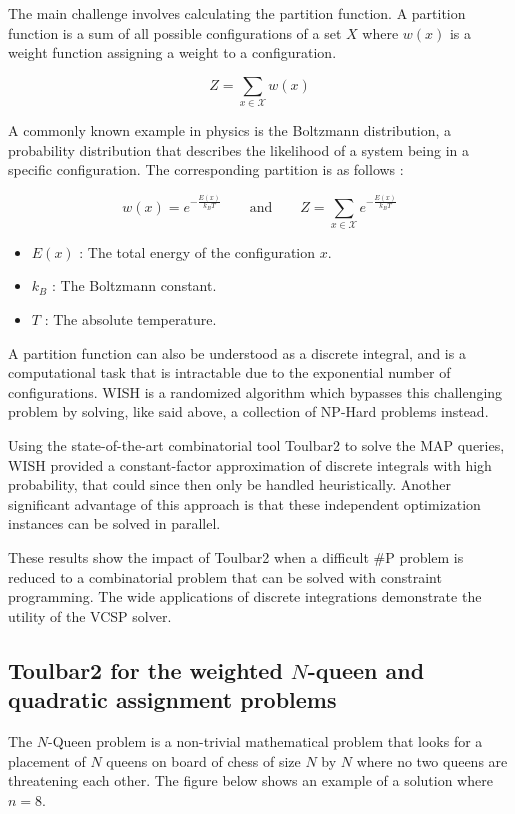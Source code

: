 \documentclass[a4paper]{article}
\begin{document}
The main challenge involves calculating the partition function. A partition function is a sum of all possible configurations of a set $X$ where $w(x)$ is a weight function assigning a weight to a configuration.

\begin{equation}
Z = \sum_{x \in \mathcal{X}} w(x)
\end{equation}

A commonly known example in physics is the Boltzmann distribution, a probability distribution that describes the likelihood of a system being in a specific configuration. The corresponding partition is as follows :

\begin{equation}
    w(x) = e^{-\frac{E(x)}{k_B T}} 
    \qquad \text{and} \qquad 
    Z = \sum_{x \in \mathcal{X}} e^{-\frac{E(x)}{k_B T}}
\end{equation}

\begin{itemize}
    \item $E(x)$ : The total energy of the configuration $x$.
    \item $k_B$ : The Boltzmann constant.
    \item $T$ : The absolute temperature.
\end{itemize}

A partition function can also be understood as a discrete integral, and is a computational task that is intractable due to the exponential number of configurations. WISH is a randomized algorithm which bypasses this challenging problem by solving, like said above, a collection of NP-Hard problems instead.
\newline

Using the state-of-the-art combinatorial tool Toulbar2 to solve the \ac{MAP} queries, WISH provided a constant-factor approximation of discrete integrals with high probability, that could since then only be handled heuristically. Another significant advantage of this approach is that these independent optimization instances can be solved in parallel. 
\newline

These results show the impact of Toulbar2 when a difficult \#P problem is reduced to a combinatorial problem that can be solved with constraint programming. The wide applications of discrete integrations demonstrate the utility of the VCSP solver.
\subsection{Toulbar2 for the weighted $N$-queen and quadratic assignment problems}
The $N$-Queen problem is a non-trivial mathematical problem that looks for a placement of $N$ queens on board of chess of size $N$ by $N$ where no two queens are threatening each other. The figure below shows an example of a solution where $n = 8$.
\end{document}
